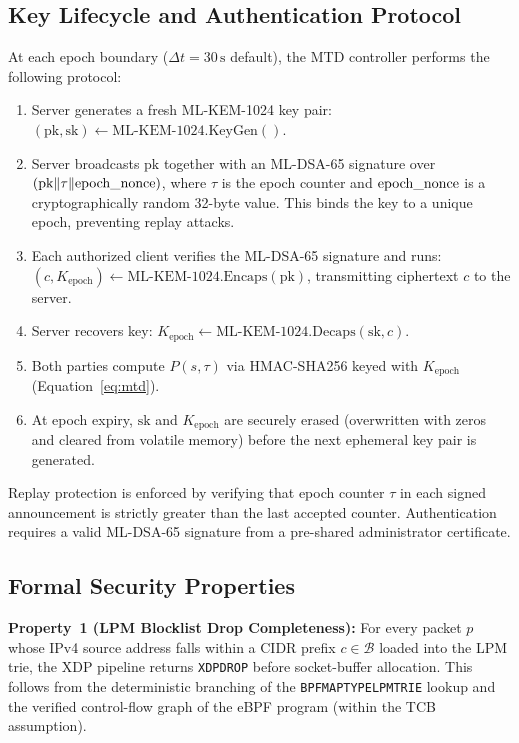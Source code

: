 \documentclass{ieeeaccess}
\renewcommand{\_}{\textunderscore\allowbreak}
\begin{document}
\subsection{Key Lifecycle and Authentication Protocol}
At each epoch boundary ($\Delta t = 30\,\text{s}$ default), the MTD controller
performs the following protocol:
\begin{enumerate}
  \item Server generates a fresh ML-KEM-1024 key pair:
    $(\text{pk}, \text{sk}) \leftarrow \text{ML-KEM-1024.KeyGen}()$.

  \item Server broadcasts $\text{pk}$ together with an ML-DSA-65 signature over
    $(\text{pk} \| \tau \| \text{epoch\_nonce})$, where $\tau$ is the epoch counter
    and $\text{epoch\_nonce}$ is a cryptographically random 32-byte value. This
    binds the key to a unique epoch, preventing replay attacks.

  \item Each authorized client verifies the ML-DSA-65 signature and runs:
    $(c, K_{\text{epoch}}) \leftarrow \text{ML-KEM-1024}.\allowbreak\text{Encaps}(\text{pk})$,
    transmitting ciphertext $c$ to the server.

  \item Server recovers key:
    $K_{\text{epoch}} \leftarrow \text{ML-KEM-1024}.\allowbreak\text{Decaps}(\text{sk}, c)$.

  \item Both parties compute $P(s, \tau)$ via HMAC-SHA256 keyed with
    $K_{\text{epoch}}$ (Equation~\ref{eq:mtd}).

  \item At epoch expiry, $\text{sk}$ and $K_{\text{epoch}}$ are securely erased
    (overwritten with zeros and cleared from volatile memory) before the next
    ephemeral key pair is generated.
\end{enumerate}
Replay protection is enforced by verifying that epoch counter $\tau$ in each
signed announcement is strictly greater than the last accepted counter.
Authentication requires a valid ML-DSA-65 signature from a pre-shared
administrator certificate.

\subsection{Formal Security Properties}

\textbf{Property~1 (LPM Blocklist Drop Completeness):}
For every packet $p$ whose IPv4 source address falls within a CIDR prefix
$c \in \mathcal{B}$ loaded into the LPM trie, the XDP pipeline returns
\texttt{XDP\_DROP} before socket-buffer allocation. This follows from the
deterministic branching of the \texttt{BPF\_MAP\_TYPE\_LPM\_TRIE} lookup and the
verified control-flow graph of the eBPF program (within the TCB assumption).
\end{document}
